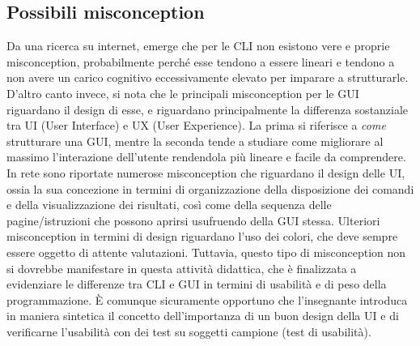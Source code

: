   \subsection{Possibili misconception}
  Da una ricerca su internet, emerge che per le CLI non esistono vere e proprie misconception, probabilmente perché esse tendono a essere lineari e tendono a non avere un carico cognitivo eccessivamente elevato per imparare a strutturarle.
  D'altro canto invece, si nota che le principali misconception per le GUI riguardano il design di esse, e riguardano principalmente la differenza sostanziale tra UI (User Interface) e UX (User Experience). La prima si riferisce a \textit{come} strutturare una GUI, mentre la seconda tende a studiare come migliorare al massimo l'interazione dell'utente rendendola più lineare e facile da comprendere.
  In rete sono riportate numerose misconception che riguardano il design delle UI, ossia la sua concezione in termini di organizzazione della disposizione dei comandi e della visualizzazione dei risultati, così come della sequenza delle pagine/istruzioni che possono aprirsi usufruendo della GUI stessa.
  Ulteriori misconception in termini di design riguardano l'uso dei colori, che deve sempre essere oggetto di attente valutazioni.
  Tuttavia, questo tipo di misconception non si dovrebbe manifestare in questa attività didattica, che è finalizzata a evidenziare le differenze tra CLI e GUI in termini di usabilità e di peso della programmazione.
  È comunque sicuramente opportuno che l'insegnante introduca in maniera sintetica il concetto dell'importanza di un buon design della UI e di verificarne l'usabilità con dei test su soggetti campione (test di usabilità).
  
